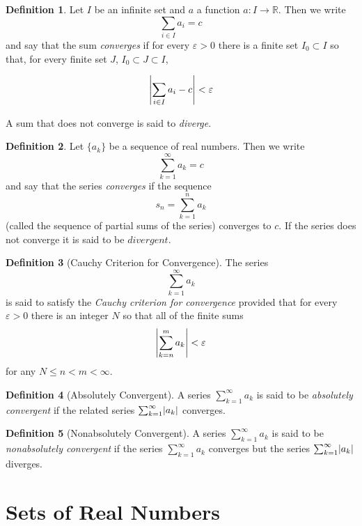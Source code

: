 \documentclass[11pt]{article}
\DeclarePairedDelimiter{\abs}{\lvert}{\rvert}
\def \R {\mathbb{R}}
\def \epsilon {\varepsilon}
\newcommand{\set}[1]{\{#1\}}
\newcommand{\sumofto}[2]{\sum_{#1=1}^{#2}}
\newcommand{\sumoftoinfty}[1]{\sumofto{#1}{\infty}}
\def \sn {s_n}
\def \ak {a_k}
\theoremstyle{definition}
\newtheorem{definition}{Definition}[section]
\begin{document}
\setcounter{definition}{1}
\begin{definition}
	Let $ I $ be an infinite set and $ a $ a function $ a : I \rightarrow \R $. Then we write
	$$\sum_{i \in I} a_i = c$$ 
	and say that the sum \textit{converges} if for every $ \epsilon > 0 $ there is a finite set $ I_0 \subset I $ so that, for every finite set $ J $, $ I_0 \subset J \subset I $,
	
	$$\abs*{\sum_{i \in I} a_i - c} < \epsilon$$ 

	A sum that does not converge is said to \textit{diverge}.
\end{definition}

\setcounter{definition}{5}
\begin{definition}
	Let $ \set{\ak} $ be a sequence of real numbers. Then we write 
		$$ \sumofto{k}{\infty} a_k = c $$
	and say that the series \textit{converges} if the sequence 
		$$\sn = \sumofto{k}{n} \ak$$
	(called the sequence of partial sums of the series) converges to $ c $. If the series does not converge it is said to be $ divergent $.
\end{definition}


\setcounter{definition}{13}
\begin{definition} [Cauchy Criterion for Convergence]
	The series $$ \sumoftoinfty{k} \ak $$ is said to satisfy the \textit{Cauchy criterion for convergence} provided that for every $ \epsilon > 0 $ there is an integer $ N $ so that all of the finite sums
	$$\abs*{\sum_{k=n}^{m} \ak} < \epsilon$$ for any $ N \leq n < m < \infty $.
\end{definition}


\begin{definition} [Absolutely Convergent]
	A series $\sumoftoinfty{k} \ak$ is said to be \textit{absolutely convergent} if the related series $\sumoftoinfty{k} \abs{\ak}$ converges.
\end{definition}


\begin{definition} [Nonabsolutely Convergent]
	A series $\sumoftoinfty{k} \ak$ is said to be \textit{nonabsolutely convergent} if the series $\sumoftoinfty{k} \ak$ converges but the series $\sumoftoinfty{k} \abs{\ak}$ diverges.
\end{definition}

\section{Sets of Real Numbers}
\end{document}
